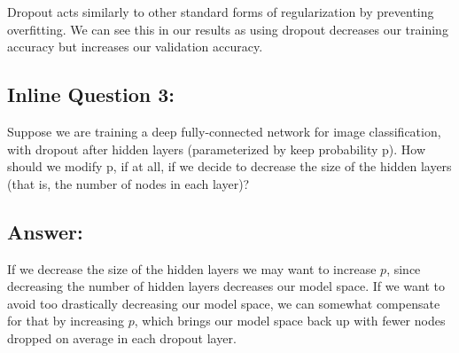 \documentclass[11pt]{article}
\begin{document}
Dropout acts similarly to other standard forms of regularization by
preventing overfitting. We can see this in our results as using dropout
decreases our training accuracy but increases our validation accuracy.

    \hypertarget{inline-question-3}{%
\subsection{Inline Question 3:}\label{inline-question-3}}

Suppose we are training a deep fully-connected network for image
classification, with dropout after hidden layers (parameterized by keep
probability p). How should we modify p, if at all, if we decide to
decrease the size of the hidden layers (that is, the number of nodes in
each layer)?

    \hypertarget{answer}{%
\subsection{Answer:}\label{answer}}

If we decrease the size of the hidden layers we may want to increase
\(p\), since decreasing the number of hidden layers decreases our model
space. If we want to avoid too drastically decreasing our model space,
we can somewhat compensate for that by increasing \(p\), which brings
our model space back up with fewer nodes dropped on average in each
dropout layer.


    
    
    
    
\end{document}
